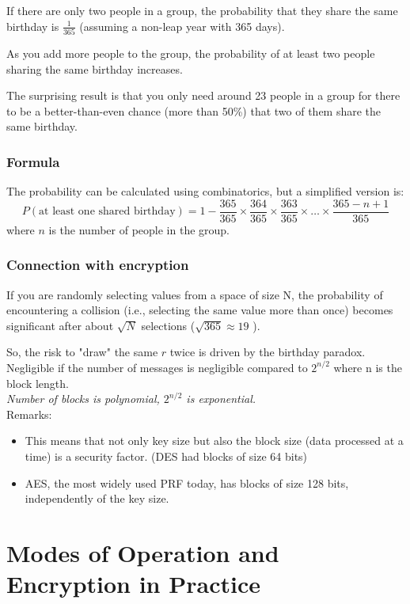 \documentclass[12pt]{article}
\begin{document}
If there are only two people in a group, the probability that they share the same birthday is $\frac{1}{365}$ (assuming a non-leap year with 365 days).

As you add more people to the group, the probability of at least two people sharing the same birthday increases.

The surprising result is that you only need around 23 people in a group for there to be a better-than-even chance (more than 50\%) that two of them share the same birthday.

\subsubsection*{Formula}

The probability can be calculated using combinatorics, but a simplified version is:
\[
P(\text{{at least one shared birthday}}) = 1 - \frac{365}{365} \times \frac{364}{365} \times \frac{363}{365} \times \ldots \times \frac{365 - n + 1}{365}
\]
where \( n \) is the number of people in the group.
\subsubsection*{Connection with encryption}
 If you are randomly selecting values from a space of size N, the probability of encountering a collision (i.e., selecting the same value more than once) becomes significant after about $\sqrt{N}$ selections ($\sqrt{365} \approx 19$ ).
 
 So, the risk to "draw" the same $r$ twice is driven by the birthday paradox. Negligible if the number of messages is negligible compared to $2^{n/2}$ where n is the block length.\\
 \emph{Number of blocks is polynomial, $2^{n/2}$ is exponential.}\\
 Remarks:
 \begin{itemize}
\item This means that not only key size but also the block size (data processed at a time) is a security factor. (DES had blocks of size 64 bits)
\item AES, the most widely used PRF today, has blocks of size 128 bits, independently of the key size.
\end{itemize}
 
\section{Modes of Operation and Encryption in Practice}
\end{document}
